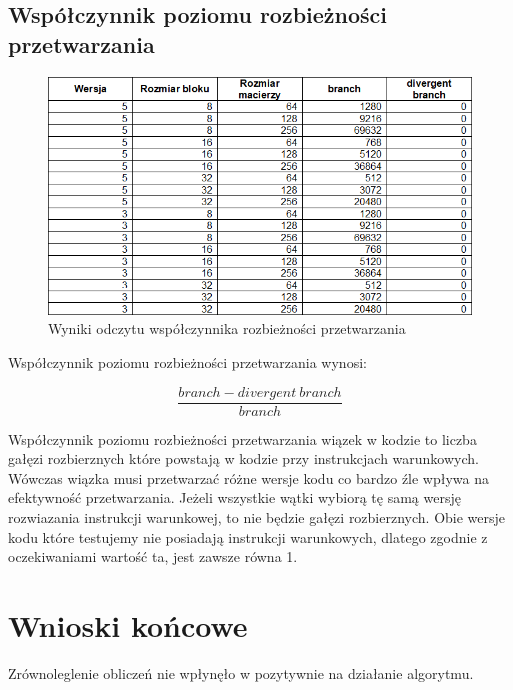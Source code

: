 \documentclass{article}
\begin{document}
\subsection{Współczynnik poziomu rozbieżności przetwarzania}

\begin{figure}[H]
	\centering
	\includegraphics[width=\linewidth]{./images/tables/table3.png}
	\caption{Wyniki odczytu współczynnika rozbieżności przetwarzania}
	\label{fig:table3}
\end{figure}

Współczynnik poziomu rozbieżności przetwarzania wynosi:

\[
\frac{branch - divergent\ branch}{branch}
\]

Współczynnik poziomu rozbieżności przetwarzania wiązek w kodzie to liczba gałęzi rozbierznych które powstają w kodzie przy instrukcjach warunkowych. Wówczas wiązka musi przetwarzać różne wersje kodu co bardzo źle wpływa na efektywność przetwarzania. Jeżeli wszystkie wątki wybiorą tę samą wersję rozwiazania instrukcji warunkowej, to nie będzie gałęzi rozbierznych. Obie wersje kodu które testujemy nie posiadają instrukcji warunkowych, dlatego zgodnie z oczekiwaniami wartość ta, jest zawsze równa 1.

\section{Wnioski końcowe}
Zrównoleglenie obliczeń nie wpłynęło w pozytywnie na działanie algorytmu.
\end{document}

